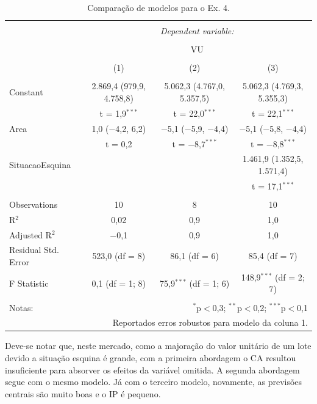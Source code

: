 \documentclass[
  a4paper, 11pt]{article}
\begin{document}
\begin{table}[H] \centering 
  \caption{Comparação de modelos para o Ex. 4.} 
  \label{tab:tab4} 
\footnotesize 
\begin{tabular}{@{\extracolsep{5pt}}lccc} 
\\[-1.8ex]\hline 
\hline \\[-1.8ex] 
 & \multicolumn{3}{c}{\textit{Dependent variable:}} \\ 
\cline{2-4} 
\\[-1.8ex] & \multicolumn{3}{c}{VU} \\ 
\\[-1.8ex] & (1) & (2) & (3)\\ 
\hline \\[-1.8ex] 
 Constant & 2.869,4 (979,9, 4.758,8) & 5.062,3 (4.767,0, 5.357,5) & 5.062,3 (4.769,3, 5.355,3) \\ 
  & t = 1,9$^{***}$ & t = 22,0$^{***}$ & t = 22,1$^{***}$ \\ 
  Area & 1,0 ($-$4,2, 6,2) & $-$5,1 ($-$5,9, $-$4,4) & $-$5,1 ($-$5,8, $-$4,4) \\ 
  & t = 0,2 & t = $-$8,7$^{***}$ & t = $-$8,8$^{***}$ \\ 
  SituacaoEsquina &  &  & 1.461,9 (1.352,5, 1.571,4) \\ 
  &  &  & t = 17,1$^{***}$ \\ 
 \hline \\[-1.8ex] 
Observations & 10 & 8 & 10 \\ 
R$^{2}$ & 0,02 & 0,9 & 1,0 \\ 
Adjusted R$^{2}$ & $-$0,1 & 0,9 & 1,0 \\ 
Residual Std. Error & 523,0 (df = 8) & 86,1 (df = 6) & 85,4 (df = 7) \\ 
F Statistic & 0,1 (df = 1; 8) & 75,9$^{***}$ (df = 1; 6) & 148,9$^{***}$ (df = 2; 7) \\ 
\hline 
\hline \\[-1.8ex] 
Notas: & \multicolumn{3}{r}{$^{*}$p$<$0,3; $^{**}$p$<$0,2; $^{***}$p$<$0,1} \\ 
 & \multicolumn{3}{r}{Reportados erros robustos para modelo da coluna 1.} \\ 
\end{tabular} 
\end{table}

Deve-se notar que, neste mercado, como a majoração do valor unitário de
um lote devido a situação esquina é grande, com a primeira abordagem o
CA resultou insuficiente para absorver os efeitos da variável omitida. A
segunda abordagem segue com o mesmo modelo. Já com o terceiro modelo,
novamente, as previsões centrais são muito boas e o IP é pequeno.
\end{document}
